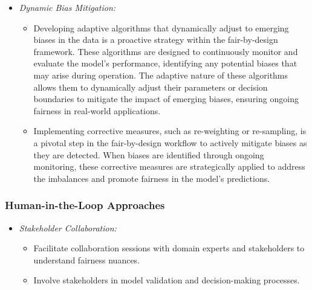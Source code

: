 \begin{itemize}
    
    \item \emph{Dynamic Bias Mitigation:}
    
    \begin{itemize}
    
        \item Developing adaptive algorithms that dynamically adjust to emerging biases in the data is a proactive strategy within the fair-by-design framework. These algorithms are designed to continuously monitor and evaluate the model's performance, identifying any potential biases that may arise during operation. The adaptive nature of these algorithms allows them to dynamically adjust their parameters or decision boundaries to mitigate the impact of emerging biases, ensuring ongoing fairness in real-world applications.
    
        \item Implementing corrective measures, such as re-weighting or re-sampling, is a pivotal step in the fair-by-design workflow to actively mitigate biases as they are detected. When biases are identified through ongoing monitoring, these corrective measures are strategically applied to address the imbalances and promote fairness in the model's predictions.
    
    \end{itemize}

\end{itemize}

\subsubsection{Human-in-the-Loop Approaches}

\begin{itemize}
    
    \item \emph{Stakeholder Collaboration:}
    
    \begin{itemize}
    
        \item Facilitate collaboration sessions with domain experts and stakeholders to understand fairness nuances.
    
        \item Involve stakeholders in model validation and decision-making processes.
    
    \end{itemize}

\end{itemize}

